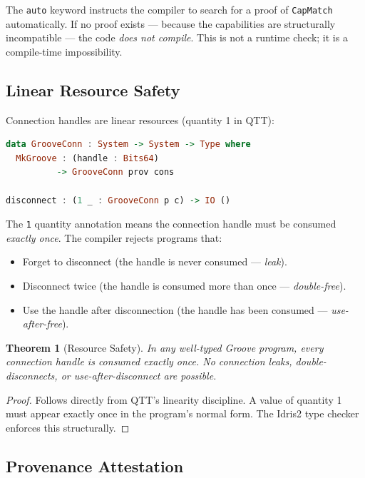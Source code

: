 \documentclass[11pt,a4paper]{article}
\newtheorem{theorem}{Theorem}
\begin{document}
The \texttt{auto} keyword instructs the compiler to search for a proof
of \texttt{CapMatch} automatically. If no proof exists --- because the
capabilities are structurally incompatible --- the code \emph{does not
compile}. This is not a runtime check; it is a compile-time impossibility.

\subsection{Linear Resource Safety}
\label{sec:linear}

Connection handles are linear resources (quantity 1 in QTT):

\begin{lstlisting}[language=Haskell,caption={Linear connection handle}]
data GrooveConn : System -> System -> Type where
  MkGroove : (handle : Bits64)
          -> GrooveConn prov cons

disconnect : (1 _ : GrooveConn p c) -> IO ()
\end{lstlisting}

The \texttt{1} quantity annotation means the connection handle must be
consumed \emph{exactly once}. The compiler rejects programs that:

\begin{itemize}
\item Forget to disconnect (the handle is never consumed --- \emph{leak}).
\item Disconnect twice (the handle is consumed more than once ---
  \emph{double-free}).
\item Use the handle after disconnection (the handle has been consumed ---
  \emph{use-after-free}).
\end{itemize}

\begin{theorem}[Resource Safety]
In any well-typed Groove program, every connection handle is consumed
exactly once. No connection leaks, double-disconnects, or
use-after-disconnect are possible.
\end{theorem}

\begin{proof}
Follows directly from QTT's linearity discipline. A value of quantity 1
must appear exactly once in the program's normal form. The Idris2 type
checker enforces this structurally.
\end{proof}

\subsection{Provenance Attestation}
\label{sec:attestation}
\end{document}
